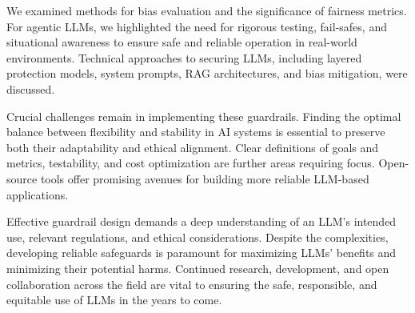 \documentclass[11pt]{article}
\begin{document}
We examined methods for bias evaluation and the significance of fairness metrics. For agentic LLMs, we highlighted the need for rigorous testing, fail-safes, and situational awareness to ensure safe and reliable operation in real-world environments.  Technical approaches to securing LLMs, including layered protection models, system prompts, RAG architectures, and bias mitigation, were discussed.

Crucial challenges remain in implementing these guardrails. Finding the optimal balance between flexibility and stability in AI systems is essential to preserve both their adaptability and ethical alignment.  Clear definitions of goals and metrics, testability, and cost optimization are further areas requiring focus. Open-source tools offer promising avenues for building more reliable LLM-based applications.

Effective guardrail design demands a deep understanding of an LLM's intended use, relevant regulations, and ethical considerations. Despite the complexities, developing reliable safeguards is paramount for maximizing LLMs' benefits and minimizing their potential harms. Continued research, development, and open collaboration across the field are vital to ensuring the safe, responsible, and equitable use of LLMs in the years to come.



\end{document}
